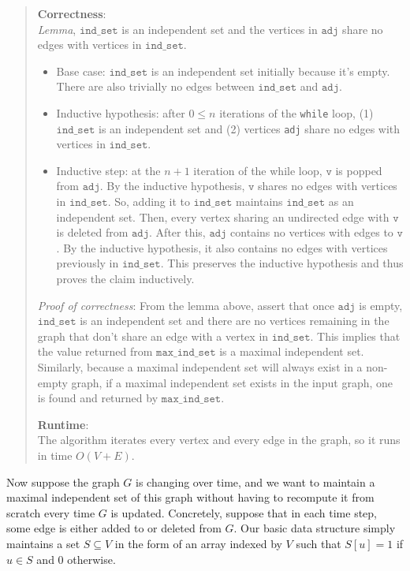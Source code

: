 \documentclass[11pt]{article}
\begin{document}
\begin{enumerate}
\begin{enumerate}
\begin{quote}
      \textbf{Correctness}: \\ 
      \textit{Lemma}, $\texttt{ind\_set}$ is an independent set and the vertices in $\texttt{adj}$ share no edges with vertices in $\texttt{ind\_set}$. 
      \begin{itemize}
        \item Base case: $\texttt{ind\_set}$ is an independent set initially because it's empty. There are also trivially no edges between $\texttt{ind\_set}$ and $\texttt{adj}$.
        \item Inductive hypothesis: after $0 \leq n$ iterations of the \texttt{while} loop, (1) $\texttt{ind\_set}$ is an independent set and (2) vertices \texttt{adj} share no edges with vertices in $\texttt{ind\_set}$. 
        \item Inductive step: at the $n + 1$ iteration of the while loop, $\texttt{v}$ is popped from $\texttt{adj}$. By the inductive hypothesis, $\texttt{v}$ shares no edges with vertices in $\texttt{ind\_set}$. So, adding it to $\texttt{ind\_set}$ maintains $\texttt{ind\_set}$ as an independent set. Then, every vertex sharing an undirected edge with $\texttt{v}$ is deleted from $\texttt{adj}$. After this, $\texttt{adj}$ contains no vertices with edges to $\texttt{v}$. By the inductive hypothesis, it also contains no edges with vertices previously in $\texttt{ind\_set}$. This preserves the inductive hypothesis and thus proves the claim inductively.
      \end{itemize}

      \medskip
      \textit{Proof of correctness}: From the lemma above, assert that once $\texttt{adj}$ is empty, $\texttt{ind\_set}$ is an independent set and there are no vertices remaining in the graph that don't share an edge with a vertex in $\texttt{ind\_set}$. This implies that the value returned from $\texttt{max\_ind\_set}$ is a maximal independent set. Similarly, because a maximal independent set will always exist in a non-empty graph, if a maximal independent set exists in the input graph, one is found and returned by $\texttt{max\_ind\_set}$. 

    \medskip
    \textbf{Runtime}: \\ 
    The algorithm iterates every vertex and every edge in the graph, so it runs in time $O(V + E)$.
    \end{quote}
\end{enumerate}

Now suppose the graph $G$ is changing over time, and we want to maintain a maximal independent set of this graph without having to recompute it from scratch every time $G$ is updated. Concretely, suppose that in each time step, some edge is either added to or deleted from $G$. Our basic data structure simply maintains a set $S \subseteq V$ in the form of an array indexed by $V$ such that $S[u]=1$ if $u \in S$ and $0$ otherwise.


\end{enumerate}
\end{document}
